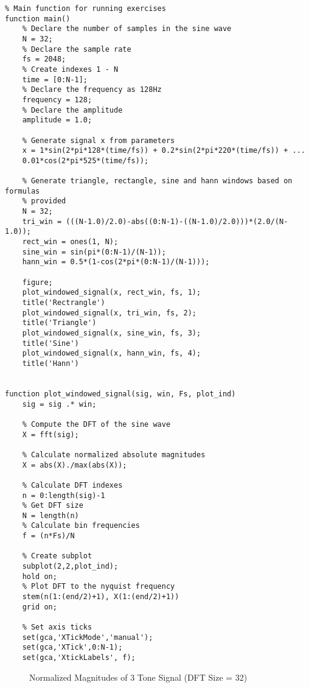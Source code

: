 \documentclass[titlepage]{scrartcl}
\begin{document}
\begin{lstlisting}
% Main function for running exercises
function main()
    % Declare the number of samples in the sine wave
    N = 32;
    % Declare the sample rate
    fs = 2048;
    % Create indexes 1 - N
    time = [0:N-1];
    % Declare the frequency as 128Hz
    frequency = 128;
    % Declare the amplitude
    amplitude = 1.0;

    % Generate signal x from parameters
    x = 1*sin(2*pi*128*(time/fs)) + 0.2*sin(2*pi*220*(time/fs)) + ...
    0.01*cos(2*pi*525*(time/fs));

    % Generate triangle, rectangle, sine and hann windows based on formulas
    % provided
    N = 32;
    tri_win = (((N-1.0)/2.0)-abs((0:N-1)-((N-1.0)/2.0)))*(2.0/(N-1.0));
    rect_win = ones(1, N);
    sine_win = sin(pi*(0:N-1)/(N-1));
    hann_win = 0.5*(1-cos(2*pi*(0:N-1)/(N-1)));

    figure;
    plot_windowed_signal(x, rect_win, fs, 1);
    title('Rectrangle')
    plot_windowed_signal(x, tri_win, fs, 2);
    title('Triangle')
    plot_windowed_signal(x, sine_win, fs, 3);
    title('Sine')
    plot_windowed_signal(x, hann_win, fs, 4);
    title('Hann')


function plot_windowed_signal(sig, win, Fs, plot_ind)
    sig = sig .* win;
    
    % Compute the DFT of the sine wave
    X = fft(sig);

    % Calculate normalized absolute magnitudes
    X = abs(X)./max(abs(X));

    % Calculate DFT indexes
    n = 0:length(sig)-1
    % Get DFT size
    N = length(n)
    % Calculate bin frequencies
    f = (n*Fs)/N

    % Create subplot
    subplot(2,2,plot_ind);
    hold on;
    % Plot DFT to the nyquist frequency
    stem(n(1:(end/2)+1), X(1:(end/2)+1))
    grid on;

    % Set axis ticks
    set(gca,'XTickMode','manual');
    set(gca,'XTick',0:N-1);
    set(gca,'XtickLabels', f);
\end{lstlisting}

\begin{figure}[H]
    \caption{Normalized Magnitudes of 3 Tone Signal (DFT Size = 32)}
    \label{WindowedSigDFT}
\end{figure}
\end{document}
